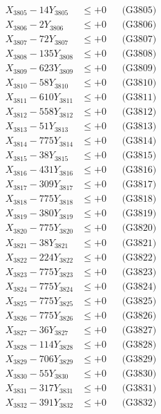 \documentclass[a4paper,10pt]{article}
\begin{document}
{\begin{align}
X_{3805} - 14Y_{3805} &\leq +0 && \text{(G3805)} \\
X_{3806} - 2Y_{3806} &\leq +0 && \text{(G3806)} \\
X_{3807} - 72Y_{3807} &\leq +0 && \text{(G3807)} \\
X_{3808} - 135Y_{3808} &\leq +0 && \text{(G3808)} \\
X_{3809} - 623Y_{3809} &\leq +0 && \text{(G3809)} \\
X_{3810} - 58Y_{3810} &\leq +0 && \text{(G3810)} \\
\allowbreak
X_{3811} - 610Y_{3811} &\leq +0 && \text{(G3811)} \\
X_{3812} - 558Y_{3812} &\leq +0 && \text{(G3812)} \\
X_{3813} - 51Y_{3813} &\leq +0 && \text{(G3813)} \\
X_{3814} - 775Y_{3814} &\leq +0 && \text{(G3814)} \\
X_{3815} - 38Y_{3815} &\leq +0 && \text{(G3815)} \\
X_{3816} - 431Y_{3816} &\leq +0 && \text{(G3816)} \\
X_{3817} - 309Y_{3817} &\leq +0 && \text{(G3817)} \\
X_{3818} - 775Y_{3818} &\leq +0 && \text{(G3818)} \\
X_{3819} - 380Y_{3819} &\leq +0 && \text{(G3819)} \\
X_{3820} - 775Y_{3820} &\leq +0 && \text{(G3820)} \\
\allowbreak
X_{3821} - 38Y_{3821} &\leq +0 && \text{(G3821)} \\
X_{3822} - 224Y_{3822} &\leq +0 && \text{(G3822)} \\
X_{3823} - 775Y_{3823} &\leq +0 && \text{(G3823)} \\
X_{3824} - 775Y_{3824} &\leq +0 && \text{(G3824)} \\
X_{3825} - 775Y_{3825} &\leq +0 && \text{(G3825)} \\
X_{3826} - 775Y_{3826} &\leq +0 && \text{(G3826)} \\
X_{3827} - 36Y_{3827} &\leq +0 && \text{(G3827)} \\
X_{3828} - 114Y_{3828} &\leq +0 && \text{(G3828)} \\
X_{3829} - 706Y_{3829} &\leq +0 && \text{(G3829)} \\
X_{3830} - 55Y_{3830} &\leq +0 && \text{(G3830)} \\
\allowbreak
X_{3831} - 317Y_{3831} &\leq +0 && \text{(G3831)} \\
X_{3832} - 391Y_{3832} &\leq +0 && \text{(G3832)} \\

\end{align}}
\end{document}
